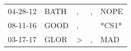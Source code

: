 \begin{supertabular}{lllll}
 04-28-12 &  BATH &             , &  , &   NOPE \\
 08-11-16 &  GOOD &             , &    &  *CS1* \\
 03-17-17 &  GLOR &  \textgreater &  , &    MAD \\
\end{supertabular}
